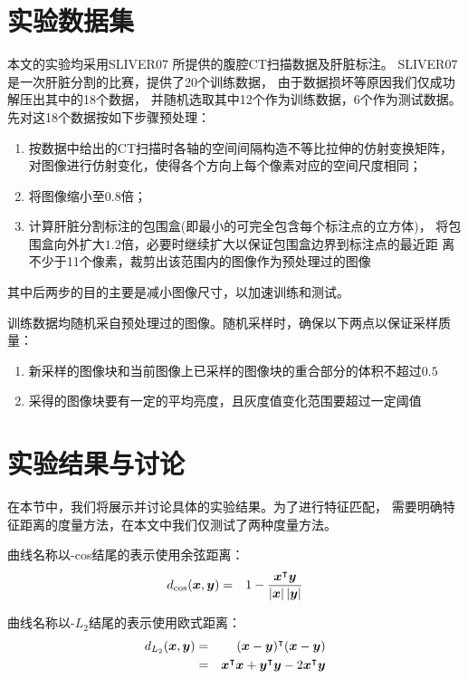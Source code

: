 \section{实验数据集}
本文的实验均采用SLIVER07\cite{heimann2009comparison}
所提供的腹腔CT扫描数据及肝脏标注。
SLIVER07是一次肝脏分割的比赛，提供了20个训练数据，
由于数据损坏等原因我们仅成功解压出其中的18个数据，
并随机选取其中12个作为训练数据，6个作为测试数据。
先对这18个数据按如下步骤预处理：
\begin{enumerate}
    \item 按数据中给出的CT扫描时各轴的空间间隔构造不等比拉伸的仿射变换矩阵，
        对图像进行仿射变化，使得各个方向上每个像素对应的空间尺度相同；
    \item 将图像缩小至$0.8$倍；
    \item 计算肝脏分割标注的包围盒(即最小的可完全包含每个标注点的立方体)，
        将包围盒向外扩大$1.2$倍，必要时继续扩大以保证包围盒边界到标注点的最近距
        离不少于11个像素，裁剪出该范围内的图像作为预处理过的图像
\end{enumerate}
其中后两步的目的主要是减小图像尺寸，以加速训练和测试。

训练数据均随机采自预处理过的图像。随机采样时，确保以下两点以保证采样质量：
\begin{enumerate}
    \item 新采样的图像块和当前图像上已采样的图像块的重合部分的体积不超过$0.5$
    \item 采得的图像块要有一定的平均亮度，且灰度值变化范围要超过一定阈值
\end{enumerate}

\section{实验结果与讨论}
在本节中，我们将展示并讨论具体的实验结果。为了进行特征匹配，
需要明确特征距离的度量方法，在本文中我们仅测试了两种度量方法。

曲线名称以-cos结尾的表示使用余弦距离：
\begin{eqnarray}
    d_{\cos}(\boldsymbol{x}, \boldsymbol{y}) &=& 1 -
        \frac{\boldsymbol{x}^\intercal\boldsymbol{y}}{\left|\boldsymbol{x}\right|\left|\boldsymbol{y}\right|}
\end{eqnarray}

曲线名称以-$L_2$结尾的表示使用欧式距离：
\begin{eqnarray}
    d_{L_2}(\boldsymbol{x}, \boldsymbol{y}) &=&
        (\boldsymbol{x}-\boldsymbol{y})^\intercal(\boldsymbol{x}-\boldsymbol{y}) \nonumber \\
        &=& \boldsymbol{x}^\intercal\boldsymbol{x} + \boldsymbol{y}^\intercal\boldsymbol{y} -
        2\boldsymbol{x}^\intercal\boldsymbol{y}
\end{eqnarray}

